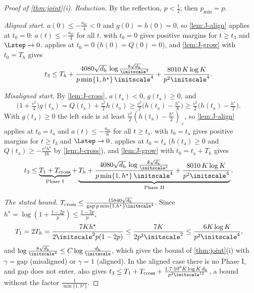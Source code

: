 \begin{proof}[Proof of \cref{thm:joint}(i)]
\emph{Reduction.} By the reflection, $p<\frac{1}{2}$; then $p_{\min}=p$.

\emph{Aligned start.} $a(0)\le-\frac{a_{\mathrm{sc}}}{4}<0$ and $g(0)=h(0)=0$, so \cref{lem:J-align} applies at $t_0=0$: $a(t)\le-\frac{a_{\mathrm{sc}}}{4}$ for all $t$.
 with $t_0=0$ gives positive margins for $t\ge t_3$ and $\Lstep\to0$.  applies at $t_0=0$ ($h(0)=Q(0)=0$), and
\cref{lem:J-grow} with $t_0=T_h$ gives
\[
 t_3\le T_h+\frac{4080\sqrt{d_{\mathrm h}}\,\log\frac{8\sqrt{d_{\mathrm h}}}{\initscale^4}}{p\min\{1,h^\star\}\,\initscale^4}+\frac{8010\,K\log K}{p^2\initscale^4} .
\]

\emph{Misaligned start.} By \cref{lem:J-cross}, $a(t_{\mathrm a})<0$, $g(t_{\mathrm a})\ge0$, and
\[
 \bigl(1+\tfrac{v^2}{4}\bigr)g(t_{\mathrm a})=Q(t_{\mathrm a})+\tfrac{v^2}{2}h(t_{\mathrm a})\ge\tfrac{v^2}{2}\bigl(h(t_{\mathrm a})-\tfrac{h^\star}{8}\bigr)\ge\tfrac{v^2}{2}\bigl(h(t_{\mathrm a})-\tfrac{h^\star}{2}\bigr).
\]
With $g(t_{\mathrm a})\ge0$ the left side is at least $\frac{v^2}{2}(h(t_{\mathrm a})-\frac{h^\star}{2})_+$, so \cref{lem:J-align} applies at $t_0=t_{\mathrm a}$ and $a(t)\le-\frac{a_{\mathrm{sc}}}{8}$ for all $t\ge t_{\mathrm a}$.  with $t_0=t_{\mathrm a}$ gives positive margins for $t\ge t_3$ and $\Lstep\to0$. 
applies at $t_0=t_{\mathrm a}$ ($h(t_{\mathrm a})\ge0$ and $Q(t_{\mathrm a})\ge-\frac{v^2h^\star}{16}$ by \cref{lem:J-cross}), and \cref{lem:J-grow} with $t_0=t_{\mathrm a}+T_h$ gives
\[
 t_3\le\underbrace{T_1+T_{\mathrm{cross}}}_{\text{Phase I}}+\underbrace{T_h+\frac{4080\sqrt{d_{\mathrm h}}\,\log\frac{8\sqrt{d_{\mathrm h}}}{\initscale^4}}{p\min\{1,h^\star\}\,\initscale^4}+\frac{8010\,K\log K}{p^2\initscale^4}}_{\text{Phase II}} .
\]

\emph{The stated bound.} $T_{\mathrm{cross}}\le\frac{15840\sqrt{d_{\mathrm h}}}{\mathrm{gap}\,p\min\{1,h^\star\}\initscale^4}$. Since $h^\star=\log(1+\frac{1-2p}{p})\le\frac{1-2p}{p}$,
\[
 T_1=2T_h=\frac{7Kh^\star}{2\initscale^2p(1-2p)}\le\frac{7K}{2p^2\initscale^2}\le\frac{6K\log K}{p^2\initscale^4},
\]
and $\log\frac{8\sqrt{d_{\mathrm h}}}{\initscale^4}\le C\log\frac{d_{\mathrm h}}{\initscale}$, which gives the bound of \cref{thm:joint}(i) with $\gamma=\mathrm{gap}$ (misaligned) or $\gamma=1$ (aligned). In the
aligned case there is no Phase I, and $\mathrm{gap}$ does not enter.  also gives $t_3\le T_1+T_{\mathrm{cross}}+\frac{1.7\cdot10^6K\log K\,d_{\mathrm h}}{p^2\initscale^{12}}$, a bound
without the factor $\frac{1}{\min\{1,h^\star\}}$.


\end{proof}
